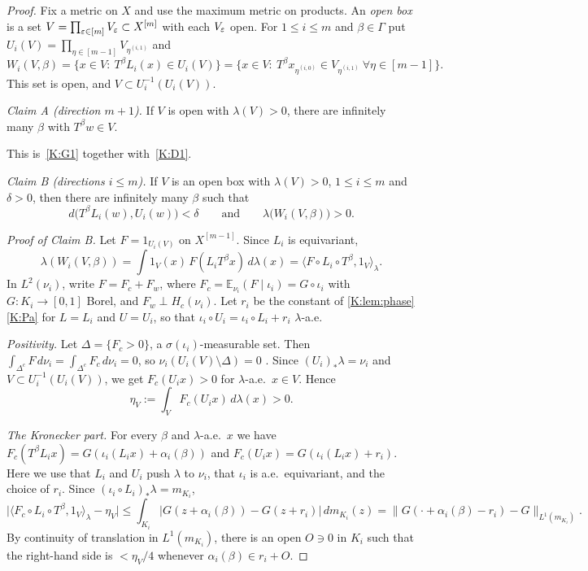 \begin{proof}
Fix a metric on $X$ and use the maximum metric on products.
An \emph{open box} is a set $V=\prod_{\varepsilon\in[m]}V_\varepsilon\subset X^{[m]}$ with each $V_\varepsilon$
open.
For $1\le i\le m$ and $\beta\in\Gamma$ put $U_i(V)=\prod_{\eta\in[m-1]}V_{\eta^{(i,1)}}$ and
\[
W_i(V,\beta)=\{x\in V:\ T^\beta L_i(x)\in U_i(V)\}
=\{x\in V:\ T^\beta x_{\eta^{(i,0)}}\in V_{\eta^{(i,1)}}\ \forall\eta\in[m-1]\}.
\]
This set is open, and $V\subset U_i^{-1}(U_i(V))$.

\smallskip\noindent\emph{Claim A (direction $m+1$).} If $V$ is open with $\lambda(V)>0$, there are
infinitely many $\beta$ with $T^\beta w\in V$.

This is~\ref{K:G1} together with~\ref{K:D1}.

\smallskip\noindent\emph{Claim B (directions $i\le m$).} If $V$ is an open box with $\lambda(V)>0$,
$1\le i\le m$ and $\delta>0$, then there are infinitely many $\beta$ such that
\[
d\big(T^\beta L_i(w),U_i(w)\big)<\delta\qquad\text{and}\qquad\lambda\big(W_i(V,\beta)\big)>0 .
\]

\emph{Proof of Claim B.}
Let $F=1_{U_i(V)}$ on $X^{[m-1]}$. Since $L_i$ is equivariant,
\begin{equation}\label{K:eq:Wi}
\lambda(W_i(V,\beta))=\int 1_V(x)\,F(L_iT^\beta x)\,d\lambda(x)=\langle F\circ L_i\circ T^\beta,1_V\rangle_\lambda .
\end{equation}
In $L^2(\nu_i)$, write $F=F_c+F_w$, where $F_c=\mathbb E_{\nu_i}(F\mid\iota_i)=G\circ\iota_i$
with $G\colon K_i\to[0,1]$ Borel, and $F_w\perp H_c(\nu_i)$.
Let $r_i$ be the constant of \cref{K:lem:phase}\ref{K:Pa} for $L=L_i$ and $U=U_i$, so that
$\iota_i\circ U_i=\iota_i\circ L_i+r_i$ $\lambda$-a.e.

\emph{Positivity.}
Let $\Delta=\{F_c>0\}$, a $\sigma(\iota_i)$-measurable set. Then
$\int_{\Delta^c}F\,d\nu_i=\int_{\Delta^c}F_c\,d\nu_i=0$, so $\nu_i(U_i(V)\setminus\Delta)=0$
\cite[Remark~2.2]{kra2026short}.
Since $(U_i)_*\lambda=\nu_i$ and $V\subset U_i^{-1}(U_i(V))$, we get $F_c(U_ix)>0$ for
$\lambda$-a.e.\ $x\in V$. Hence
\[
\eta_V:=\int_VF_c(U_ix)\,d\lambda(x)>0 .
\]

\emph{The Kronecker part.}
For every $\beta$ and $\lambda$-a.e.\ $x$ we have
$F_c(T^\beta L_ix)=G(\iota_i(L_ix)+\alpha_i(\beta))$ and
$F_c(U_ix)=G(\iota_i(L_ix)+r_i)$. Here we use that $L_i$ and $U_i$ push $\lambda$ to $\nu_i$,
that $\iota_i$ is a.e.\ equivariant, and the choice of $r_i$.
Since $(\iota_i\circ L_i)_*\lambda=m_{K_i}$,
\[
\big|\langle F_c\circ L_i\circ T^\beta,1_V\rangle_\lambda-\eta_V\big|
\le\int_{K_i}\big|G(z+\alpha_i(\beta))-G(z+r_i)\big|\,dm_{K_i}(z)
=\big\|G(\cdot+\alpha_i(\beta)-r_i)-G\big\|_{L^1(m_{K_i})}.
\]
By continuity of translation in $L^1(m_{K_i})$, there is an open $O\ni0$ in $K_i$ such that
the right-hand side is $<\eta_V/4$ whenever $\alpha_i(\beta)\in r_i+O$.


\end{proof}
